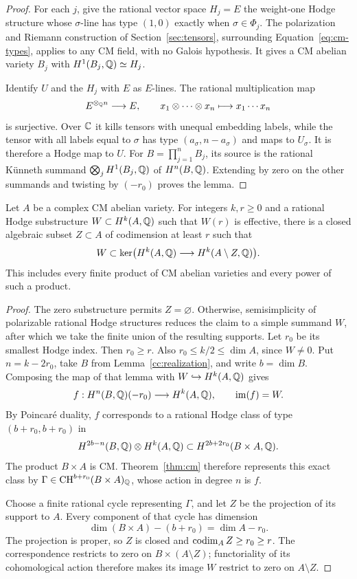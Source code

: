 \begin{proof}
For each \(j\), give the rational vector space \(H_j=E\) the
weight-one Hodge structure whose \(\sigma\)-line has type \((1,0)\)
exactly when \(\sigma\in\Phi_j\).  The polarization and Riemann
construction of Section~\ref{sec:tensors}, surrounding
Equation~\eqref{eq:cm-types}, applies to any CM field, with no
Galois hypothesis.  It gives a CM abelian variety \(B_j\) with
\(H^1(B_j,\mathbb{Q})\simeq H_j\).

Identify \(U\) and the \(H_j\) with \(E\) as \(E\)-lines. The rational
multiplication map
\[
 E^{\otimes_{\mathbb{Q}} n}\longrightarrow E,\qquad
 x_1\otimes\cdots\otimes x_n\longmapsto x_1\cdots x_n
\]
is surjective. Over \(\mathbb{C}\) it kills tensors with unequal embedding
labels, while the tensor with all labels equal to \(\sigma\) has type
\((a_\sigma,n-a_\sigma)\) and maps to \(U_\sigma\). It is therefore a
Hodge map to \(U\). For \(B=\prod_{j=1}^nB_j\), its source is the
rational Künneth summand \(\bigotimes_j H^1(B_j,\mathbb{Q})\) of \(H^n(B,\mathbb{Q})\).
Extending by zero on the other summands and twisting by \((-r_0)\)
proves the lemma.
\end{proof}

\begin{corollary}
\label{cc:ghc}
Let \(A\) be a complex CM abelian variety. For integers \(k,r\ge0\)
and a rational Hodge substructure \(W\subset H^k(A,\mathbb{Q})\) such that
\(W(r)\) is effective, there is a closed algebraic subset \(Z\subset A\)
of codimension at least \(r\) such that
\[
 W\subset\ker\bigl(H^k(A,\mathbb{Q})\longrightarrow
                         H^k(A\setminus Z,\mathbb{Q})\bigr).
\]
This includes every finite product of CM abelian varieties and every
power of such a product.
\end{corollary}

\begin{proof}
The zero substructure permits \(Z=\varnothing\). Otherwise,
semisimplicity of polarizable rational Hodge structures reduces the
claim to a simple summand \(W\), after which we take the finite union
of the resulting supports. Let \(r_0\) be its smallest Hodge index.
Then \(r_0\ge r\). Also \(r_0\le k/2\le\dim A\), since \(W\ne0\).
Put \(n=k-2r_0\), take \(B\) from
Lemma~\ref{cc:realization}, and write \(b=\dim B\). Composing the map
of that lemma with \(W\hookrightarrow H^k(A,\mathbb{Q})\) gives
\[
 f:H^n(B,\mathbb{Q})(-r_0)\longrightarrow H^k(A,\mathbb{Q}),
 \qquad \operatorname{im}(f)=W.
\]
By Poincaré duality, \(f\) corresponds to a rational Hodge class of
type \((b+r_0,b+r_0)\) in
\[
 H^{2b-n}(B,\mathbb{Q})\otimes H^k(A,\mathbb{Q})
 \subset H^{2b+2r_0}(B\times A,\mathbb{Q}).
\]
The product \(B\times A\) is CM. Theorem~\ref{thm:cm} therefore
represents this exact class by
\(\Gamma\in\operatorname{CH}^{b+r_0}(B\times A)_{\mathbb{Q}}\), whose action in degree \(n\)
is \(f\).

Choose a finite rational cycle representing \(\Gamma\), and let
\(Z\) be the projection of its support to \(A\). Every component of
that cycle has dimension
\[
 \dim(B\times A)-(b+r_0)=\dim A-r_0.
\]
The projection is proper, so \(Z\) is closed and
\(\operatorname{codim}_A Z\ge r_0\ge r\). The correspondence restricts to zero on
\(B\times(A\setminus Z)\); functoriality of its cohomological action
therefore makes its image \(W\) restrict to zero on \(A\setminus Z\).
\end{proof}

